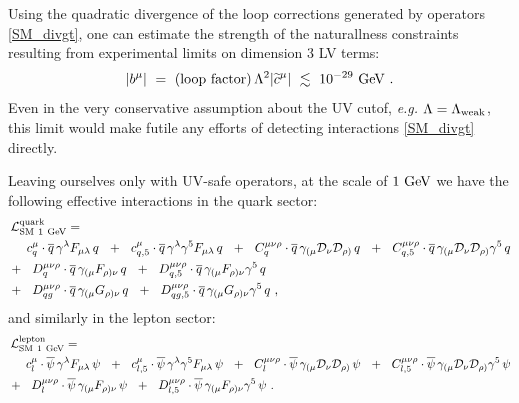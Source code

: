 \documentclass[12pt,preprintnumbers,nofootinbib]{revtex4}
\newcommand{\wt}{\widetilde}
\newcommand{\ov}{\overline}
\newcommand{\md}{\mathcal{D}}
\newcommand{\GeV}{{\rm GeV}}
\begin{document}
Using the quadratic divergence of the loop corrections generated by operators \eqref{SM_divgt},
one can estimate the strength of the naturallness constraints resulting from experimental limits 
on dimension 3 LV terms:
\cite{Gagnon:2004xh}
\begin{equation}
\label{limit_dim3}
	| b^\mu | ~=~ ({\rm loop\ factor})\, 
		\Lambda^2 | \wt{c}^\mu |  ~\lesssim~ 10^{-29}~{\rm GeV}~.
\end{equation}
	Even in the very conservative assumption about the UV cutof, 
{\it e.g.} $ \Lambda = \Lambda_{\rm weak} $,
	this limit would make futile any efforts of detecting interactions \eqref{SM_divgt}
	directly. 
	
	
	
	Leaving ourselves only with UV-safe operators, 
	at the scale of $ 1~\GeV $ we 
	have the following effective interactions in the quark sector:
\begin{align}
\nonumber
	\mathcal{L}_{\rm SM\ 1~GeV}^{\rm quark} = \hspace{-2.0cm}&
	\\
\nonumber
	&
	\phantom{+~~}
	c_{q}^\mu \cdot
	\ov{q}\, \gamma^\lambda F_{\mu\lambda}\, q 
	~~+~~
	c_{q,5}^\mu \cdot
	\ov{q}\, \gamma^\lambda \gamma^5 F_{\mu\lambda}\, q 
	~~+~~
	C_q^{\mu\nu\rho} \cdot
	\ov{q}\, \gamma_{(\mu} \md_\nu \md_{\rho)}\, q
	~~+~~
	C_{q,5}^{\mu\nu\rho} \cdot
	\ov{q}\, \gamma_{(\mu} \md_\nu \md_{\rho)}\gamma^5\, q
	\\
\label{SM_quark_1GeV}
	&
	+~~
	D_{q}^{\mu\nu\rho} \cdot
	\ov{q}\, \gamma_{(\mu} F_{\rho)\nu}\, q
	~~+~~
	D_{q,5}^{\mu\nu\rho} \cdot
	\ov{q}\, \gamma_{(\mu} F_{\rho)\nu}\gamma^5\, q
	\\
\nonumber
	&
	+~~
	D_{qg}^{\mu\nu\rho} \cdot
	\ov{q}\, \gamma_{(\mu} G_{\rho)\nu}\, q
	~~+~~
	D_{qg,5}^{\mu\nu\rho} \cdot
	\ov{q}\, \gamma_{(\mu} G_{\rho)\nu}\gamma^5\, q
	~,
\end{align}
	and similarly in the lepton sector:
\begin{align}
\nonumber
	\mathcal{L}_{\rm SM\ 1~GeV}^{\rm lepton} = \hspace{-2.0cm}&
	\\
\nonumber
	&
	\phantom{+~~}
	c_l^\mu \cdot
	\ov{\psi}\, \gamma^{\lambda} F_{\mu\lambda}\, \psi
	~~+~~
	c_{l,5}^\mu \cdot
	\ov{\psi}\, \gamma^{\lambda}\gamma^5 F_{\mu\lambda}\, \psi
	~~+~~
	C_l^{\mu\nu\rho} \cdot
	\ov{\psi}\, \gamma_{(\mu} \md_\nu \md_{\rho)}\, \psi
	~~+~~
	C_{l,5}^{\mu\nu\rho} \cdot
	\ov{\psi}\, \gamma_{(\mu} \md_\nu \md_{\rho)}\gamma^5\, \psi
	\\
\label{SM_lepton_1GeV}
	&
	+~~
	D_{l}^{\mu\nu\rho} \cdot
	\ov{\psi}\, \gamma_{(\mu} F_{\rho)\nu}\, \psi
	~~+~~
	D_{l,5}^{\mu\nu\rho} \cdot
	\ov{\psi}\, \gamma_{(\mu} F_{\rho)\nu}\gamma^5\, \psi
	~.
\end{align}
\end{document}

